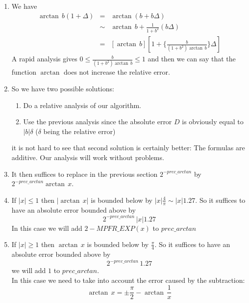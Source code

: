 \documentclass[12pt]{amsart}
\begin{document}
\begin{enumerate}
\item We have
\begin{equation*}
\begin{array}{rcl}
\arctan\,b(1+\Delta)
&=&\arctan(b+b\Delta)\\
&\sim&\arctan\,b+\frac{1}{1+b^2}(b\Delta)\\
&=&[\arctan\,b][1+\{\frac{b}{(1+b^2)\arctan\,b}\}\Delta]
\end{array}
\end{equation*}
A rapid analysis gives $0\leq \frac{b}{(1+b^2)\arctan\,b}\leq 1$ and then we can say that the function $\arctan$ does not increase the relative error.
\item So we have two possible solutions:
\begin{enumerate}
\item Do a relative analysis of our algorithm.
\item Use the previous analysis since the absolute error $D$ is obviously equal to $|b|\delta$ ($\delta$ being the relative error)
\end{enumerate}
it is not hard to see that second solution is certainly better: The formulas are additive. Our analysis will work without problems.
\item It then suffices to replace in the previous section $2^{-prec\_arctan}$ by $2^{-prec\_arctan}\arctan\,x$.
\item If $|x|\leq 1$ then $|\arctan\,x|$ is bounded below by $|x|\frac{4}{\pi}\sim |x|1.27$. So it suffices to have an absolute error bounded above by
\begin{equation*}
2^{-prec\_arctan}\,|x|1.27
\end{equation*}
In this case we will add $2-MPFR\_EXP(x)$ to $prec\_arctan$
\item If $|x|\geq 1$ then $\arctan\,x$ is bounded below by $\frac{\pi}{4}$. So it suffices to have an absolute error bounded above by
\begin{equation*}
2^{-prec\_arctan}\, 1.27
\end{equation*}
we will add $1$ to $prec\_arctan$.\\
In this case we need to take into account the error caused by the subtraction:
\begin{equation*}
\arctan\,x=\pm\frac{\pi}{2}-\arctan\,\frac{1}{x}
\end{equation*}


\end{enumerate}
\end{document}
